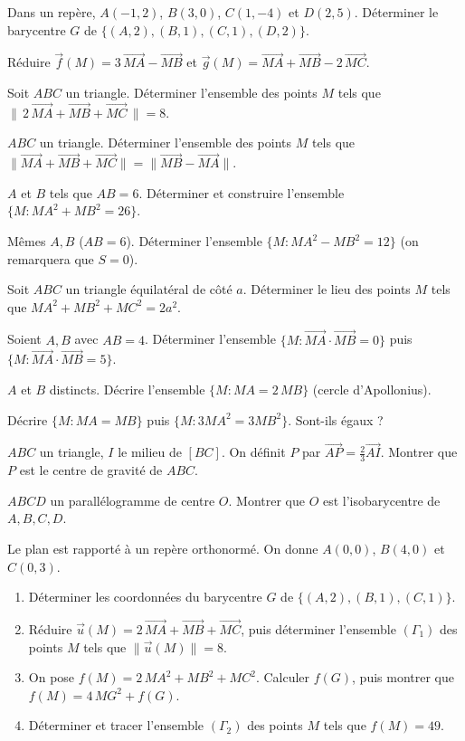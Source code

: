 \exo{} Dans un repère, $A(-1,2)$, $B(3,0)$, $C(1,-4)$ et $D(2,5)$. Déterminer le barycentre $G$ de $\{(A,2),(B,1),(C,1),(D,2)\}$.

\exo{} Réduire $\vec f(M)=3\,\overrightarrow{MA}-\overrightarrow{MB}$ et $\vec g(M)=\overrightarrow{MA}+\overrightarrow{MB}-2\,\overrightarrow{MC}$.

\exo{} Soit $ABC$ un triangle. Déterminer l'ensemble des points $M$ tels que $\big\|\,2\,\overrightarrow{MA}+\overrightarrow{MB}+\overrightarrow{MC}\,\big\|=8$.

\exo{} $ABC$ un triangle. Déterminer l'ensemble des points $M$ tels que $\big\|\overrightarrow{MA}+\overrightarrow{MB}+\overrightarrow{MC}\big\|=\big\|\overrightarrow{MB}-\overrightarrow{MA}\big\|$.

\exo{} $A$ et $B$ tels que $AB=6$. Déterminer et construire l'ensemble $\{M:MA^{2}+MB^{2}=26\}$.

\exo{} Mêmes $A,B$ ($AB=6$). Déterminer l'ensemble $\{M:MA^{2}-MB^{2}=12\}$ (on remarquera que $S=0$).

\exo{} Soit $ABC$ un triangle équilatéral de côté $a$. Déterminer le lieu des points $M$ tels que $MA^{2}+MB^{2}+MC^{2}=2a^{2}$.

\exo{} Soient $A,B$ avec $AB=4$. Déterminer l'ensemble $\{M:\overrightarrow{MA}\cdot\overrightarrow{MB}=0\}$ puis $\{M:\overrightarrow{MA}\cdot\overrightarrow{MB}=5\}$.

\exo{} $A$ et $B$ distincts. Décrire l'ensemble $\{M:MA=2\,MB\}$ (cercle d'Apollonius).

\exo{} Décrire $\{M:MA=MB\}$ puis $\{M:3MA^2=3MB^2\}$. Sont-ils égaux ?

\exo{} $ABC$ un triangle, $I$ le milieu de $[BC]$. On définit $P$ par $\overrightarrow{AP}=\frac23\overrightarrow{AI}$. Montrer que $P$ est le centre de gravité de $ABC$.

\exo{} $ABCD$ un parallélogramme de centre $O$. Montrer que $O$ est l'isobarycentre de $A,B,C,D$.

\exo{} Le plan est rapporté à un repère orthonormé. On donne $A(0,0)$, $B(4,0)$ et $C(0,3)$.
\begin{enumerate}[label=\arabic*)]
\item Déterminer les coordonnées du barycentre $G$ de $\{(A,2),(B,1),(C,1)\}$.
\item Réduire $\vec u(M)=2\,\overrightarrow{MA}+\overrightarrow{MB}+\overrightarrow{MC}$, puis déterminer l'ensemble $(\Gamma_1)$ des points $M$ tels que $\big\|\vec u(M)\big\|=8$.
\item On pose $f(M)=2\,MA^{2}+MB^{2}+MC^{2}$. Calculer $f(G)$, puis montrer que $f(M)=4\,MG^{2}+f(G)$.
\item Déterminer et tracer l'ensemble $(\Gamma_2)$ des points $M$ tels que $f(M)=49$.
\end{enumerate}

